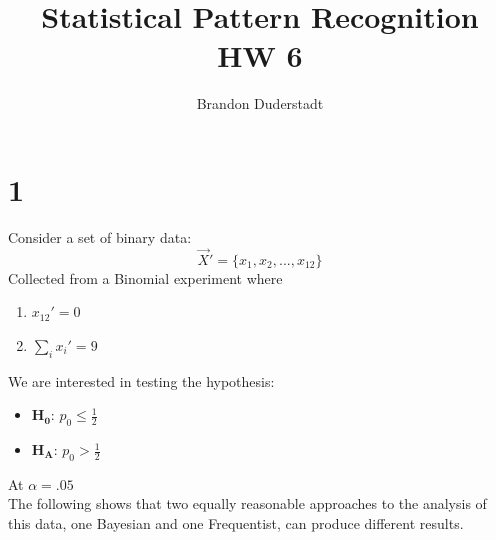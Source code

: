 \documentclass{article}
\title{Statistical Pattern Recognition HW 6}
\author{Brandon Duderstadt}
\begin{document}
  \maketitle
  \section*{1}
    Consider a set of binary data:
    $$\vec X' = \{x_1, x_2, ..., x_{12}\}$$
    Collected from a Binomial experiment where
    \begin{enumerate}
      \item $x_{12}' = 0$
      \item $\sum_i x_i' = 9$
    \end{enumerate}
    We are interested in testing the hypothesis:
    \begin{itemize}
      \item[] $\mathbf{H_0}$: $p_0 \leq \frac{1}{2}$
      \item[] $\mathbf{H_A}$: $p_0 > \frac{1}{2}$
    \end{itemize}
    At $\alpha=.05$\\[12pt]
    The following shows that two equally reasonable approaches to the analysis of this data, one Bayesian and one Frequentist, can produce different results.
\end{document}

